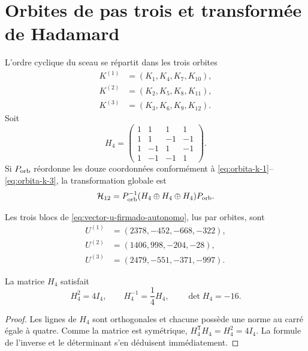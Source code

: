 \section{Orbites de pas trois et transformée de Hadamard}

L’ordre cyclique du sceau se répartit dans les trois orbites
\begin{align}
 K^{(1)}&=(K_1,K_4,K_7,K_{10}),
 \label{eq:orbita-k-1}\\
 K^{(2)}&=(K_2,K_5,K_8,K_{11}),
 \label{eq:orbita-k-2}\\
 K^{(3)}&=(K_3,K_6,K_9,K_{12}).
 \label{eq:orbita-k-3}
\end{align}
Soit
\begin{equation}
 H_4=
 \begin{pmatrix}
 1&1&1&1\\
 1&1&-1&-1\\
 1&-1&1&-1\\
 1&-1&-1&1
 \end{pmatrix}.
 \label{eq:matriz-hadamard-cuatro-autonoma}
\end{equation}
Si \(P_{\rm orb}\) réordonne les douze coordonnées conformément à
\eqref{eq:orbita-k-1}--\eqref{eq:orbita-k-3}, la transformation globale est
\begin{equation}
 \mathcal H_{12}
 =P_{\rm orb}^{-1}
 (H_4\oplus H_4\oplus H_4)P_{\rm orb}.
 \label{eq:hadamard-global-doce}
\end{equation}

Les trois blocs de \eqref{eq:vector-u-firmado-autonomo}, lus par
orbites, sont
\begin{align*}
 U^{(1)}&=(2378,-452,-668,-322),\\
 U^{(2)}&=(1406,998,-204,-28),\\
 U^{(3)}&=(2479,-551,-371,-997).
\end{align*}

\begin{lemma}
\label{lem:cuarto-inversa-hadamard}
La matrice \(H_4\) satisfait
\begin{equation}
 H_4^2=4I_4,
 \qquad
 H_4^{-1}=\frac14H_4,
 \qquad
 \det H_4=-16.
 \label{eq:identidades-hadamard-cuatro}
\end{equation}
\end{lemma}

\begin{proof}
Les lignes de \(H_4\) sont orthogonales et chacune possède une norme au carré égale à quatre.
Comme la matrice est symétrique, \(H_4^{\mathsf T}H_4=H_4^2=4I_4\). La
formule de l’inverse et le déterminant s’en déduisent immédiatement.
\end{proof}

